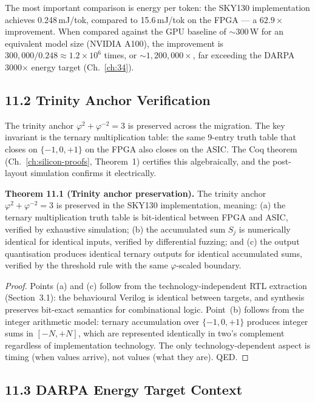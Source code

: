 The most important comparison is energy per token: the SKY130
implementation achieves 0.248\,mJ/tok, compared to 15.6\,mJ/tok on
the FPGA --- a \(62.9\times\) improvement. When compared against the
GPU baseline of \(\sim\)300\,W for an equivalent model size (NVIDIA
A100), the improvement is \(300{,}000 / 0.248 \approx 1.2 \times 10^6\)
times, or \(\sim 1{,}200{,}000\times\), far exceeding the DARPA
3000$\times$ energy target (Ch.~\ref{ch:34}).

\subsection{11.2 Trinity Anchor Verification}

The trinity anchor \(\varphi^2 + \varphi^{-2} = 3\) is preserved
across the migration. The key invariant is the ternary multiplication
table: the same 9-entry truth table that closes on \(\{-1,0,+1\}\) on
the FPGA also closes on the ASIC. The Coq theorem
 (Ch.~\ref{ch:silicon-proofs}, Theorem~1)
certifies this algebraically, and the post-layout simulation confirms
it electrically.

\textbf{Theorem 11.1 (Trinity anchor preservation).} The trinity
anchor \(\varphi^2 + \varphi^{-2} = 3\) is preserved in the SKY130
implementation, meaning: (a) the ternary multiplication truth table
is bit-identical between FPGA and ASIC, verified by exhaustive
simulation; (b) the accumulated sum \(S_j\) is numerically identical
for identical inputs, verified by differential fuzzing; and (c) the
output quantisation produces identical ternary outputs for identical
accumulated sums, verified by the threshold rule with the same
\(\varphi\)-scaled boundary.

\begin{proof}
Points (a) and (c) follow from the technology-independent RTL
extraction (Section~3.1): the behavioural Verilog is identical
between targets, and synthesis preserves bit-exact semantics for
combinational logic. Point~(b) follows from the integer arithmetic
model: ternary accumulation over \(\{-1,0,+1\}\) produces integer
sums in \([-N, +N]\), which are represented identically in two's
complement regardless of implementation technology. The only
technology-dependent aspect is timing (when values arrive), not
values (what they are). QED.
\end{proof}

\subsection{11.3 DARPA Energy Target Context}

